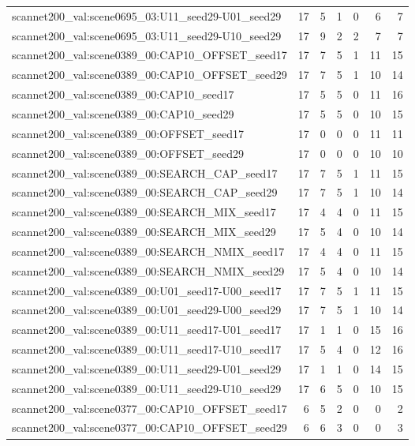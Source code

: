 \begin{table}[t]
\begin{tabular}{lrrrrrr}
scannet200\_val:scene0695\_03:U11\_seed29-U01\_seed29 & 17 & 5 & 1 & 0 & 6 & 7 \\
scannet200\_val:scene0695\_03:U11\_seed29-U10\_seed29 & 17 & 9 & 2 & 2 & 7 & 7 \\
scannet200\_val:scene0389\_00:CAP10\_OFFSET\_seed17 & 17 & 7 & 5 & 1 & 11 & 15 \\
scannet200\_val:scene0389\_00:CAP10\_OFFSET\_seed29 & 17 & 7 & 5 & 1 & 10 & 14 \\
scannet200\_val:scene0389\_00:CAP10\_seed17 & 17 & 5 & 5 & 0 & 11 & 16 \\
scannet200\_val:scene0389\_00:CAP10\_seed29 & 17 & 5 & 5 & 0 & 10 & 15 \\
scannet200\_val:scene0389\_00:OFFSET\_seed17 & 17 & 0 & 0 & 0 & 11 & 11 \\
scannet200\_val:scene0389\_00:OFFSET\_seed29 & 17 & 0 & 0 & 0 & 10 & 10 \\
scannet200\_val:scene0389\_00:SEARCH\_CAP\_seed17 & 17 & 7 & 5 & 1 & 11 & 15 \\
scannet200\_val:scene0389\_00:SEARCH\_CAP\_seed29 & 17 & 7 & 5 & 1 & 10 & 14 \\
scannet200\_val:scene0389\_00:SEARCH\_MIX\_seed17 & 17 & 4 & 4 & 0 & 11 & 15 \\
scannet200\_val:scene0389\_00:SEARCH\_MIX\_seed29 & 17 & 5 & 4 & 0 & 10 & 14 \\
scannet200\_val:scene0389\_00:SEARCH\_NMIX\_seed17 & 17 & 4 & 4 & 0 & 11 & 15 \\
scannet200\_val:scene0389\_00:SEARCH\_NMIX\_seed29 & 17 & 5 & 4 & 0 & 10 & 14 \\
scannet200\_val:scene0389\_00:U01\_seed17-U00\_seed17 & 17 & 7 & 5 & 1 & 11 & 15 \\
scannet200\_val:scene0389\_00:U01\_seed29-U00\_seed29 & 17 & 7 & 5 & 1 & 10 & 14 \\
scannet200\_val:scene0389\_00:U11\_seed17-U01\_seed17 & 17 & 1 & 1 & 0 & 15 & 16 \\
scannet200\_val:scene0389\_00:U11\_seed17-U10\_seed17 & 17 & 5 & 4 & 0 & 12 & 16 \\
scannet200\_val:scene0389\_00:U11\_seed29-U01\_seed29 & 17 & 1 & 1 & 0 & 14 & 15 \\
scannet200\_val:scene0389\_00:U11\_seed29-U10\_seed29 & 17 & 6 & 5 & 0 & 10 & 15 \\
scannet200\_val:scene0377\_00:CAP10\_OFFSET\_seed17 & 6 & 5 & 2 & 0 & 0 & 2 \\
scannet200\_val:scene0377\_00:CAP10\_OFFSET\_seed29 & 6 & 6 & 3 & 0 & 0 & 3 \\

\end{tabular}
\end{table}
